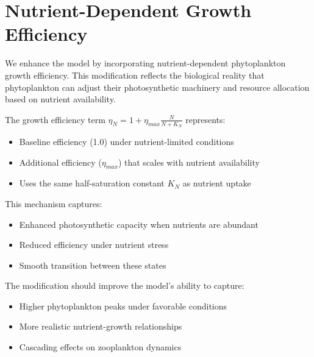 \section{Nutrient-Dependent Growth Efficiency}

We enhance the model by incorporating nutrient-dependent phytoplankton growth efficiency. This modification reflects the biological reality that phytoplankton can adjust their photosynthetic machinery and resource allocation based on nutrient availability.

The growth efficiency term $\eta_N = 1 + \eta_{max} \frac{N}{N + K_N}$ represents:
\begin{itemize}
    \item Baseline efficiency (1.0) under nutrient-limited conditions
    \item Additional efficiency ($\eta_{max}$) that scales with nutrient availability
    \item Uses the same half-saturation constant $K_N$ as nutrient uptake
\end{itemize}

This mechanism captures:
\begin{itemize}
    \item Enhanced photosynthetic capacity when nutrients are abundant
    \item Reduced efficiency under nutrient stress
    \item Smooth transition between these states
\end{itemize}

The modification should improve the model's ability to capture:
\begin{itemize}
    \item Higher phytoplankton peaks under favorable conditions
    \item More realistic nutrient-growth relationships
    \item Cascading effects on zooplankton dynamics
\end{itemize}
